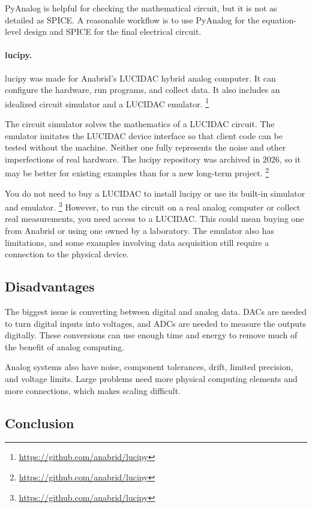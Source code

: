 \documentclass{article}
\begin{document}
PyAnalog is helpful for checking the mathematical circuit, but it is not as detailed as SPICE. A reasonable workflow is to use PyAnalog for the equation-level design and SPICE for the final electrical circuit.

\paragraph{lucipy.}
lucipy was made for Anabrid's LUCIDAC hybrid analog computer. It can configure the hardware, run programs, and collect data. It also includes an idealized circuit simulator and a LUCIDAC emulator.
\footnote{\url{https://github.com/anabrid/lucipy}}

The circuit simulator solves the mathematics of a LUCIDAC circuit. The emulator imitates the LUCIDAC device interface so that client code can be tested without the machine. Neither one fully represents the noise and other imperfections of real hardware. The lucipy repository was archived in 2026, so it may be better for existing examples than for a new long-term project.
\footnote{\url{https://github.com/anabrid/lucipy}}

You do not need to buy a LUCIDAC to install lucipy or use its built-in simulator and emulator.
\footnote{\url{https://github.com/anabrid/lucipy}}
However, to run the circuit on a real analog computer or collect real measurements, you need access to a LUCIDAC. This could mean buying one from Anabrid or using one owned by a laboratory. The emulator also has limitations, and some examples involving data acquisition still require a connection to the physical device.

\subsection{Disadvantages}

The biggest issue is converting between digital and analog data. DACs are needed to turn digital inputs into voltages, and ADCs are needed to measure the outputs digitally. These conversions can use enough time and energy to remove much of the benefit of analog computing.

Analog systems also have noise, component tolerances, drift, limited precision, and voltage limits. Large problems need more physical computing elements and more connections, which makes scaling difficult.

\subsection{Conclusion}
\end{document}
